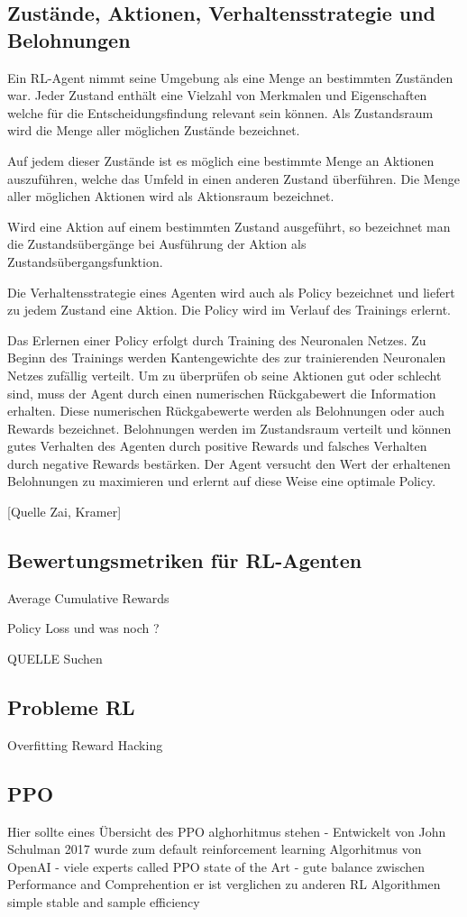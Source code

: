 \subsection{Zustände, Aktionen, Verhaltensstrategie und Belohnungen}
Ein RL-Agent nimmt seine Umgebung als eine Menge an bestimmten Zuständen war.
Jeder Zustand enthält eine Vielzahl von Merkmalen und Eigenschaften welche für die Entscheidungsfindung relevant sein können.
Als Zustandsraum wird die Menge aller möglichen Zustände bezeichnet.

Auf jedem dieser Zustände ist es möglich eine bestimmte Menge an Aktionen auszuführen, welche das Umfeld in einen anderen Zustand überführen.
Die Menge aller möglichen Aktionen wird als Aktionsraum bezeichnet.

Wird eine Aktion auf einem bestimmten Zustand ausgeführt, so bezeichnet man die Zustandsübergänge bei Ausführung der Aktion als Zustandsübergangsfunktion.


Die Verhaltensstrategie \pi eines Agenten wird auch als Policy bezeichnet und liefert zu jedem Zustand eine Aktion. Die Policy wird im Verlauf des Trainings erlernt.

Das Erlernen einer Policy erfolgt durch Training des Neuronalen Netzes.
Zu Beginn des Trainings werden Kantengewichte des zur trainierenden Neuronalen Netzes zufällig verteilt. Um zu überprüfen ob seine Aktionen gut oder schlecht sind, muss der Agent durch einen numerischen Rückgabewert die Information erhalten. Diese numerischen Rückgabewerte werden als Belohnungen oder auch Rewards bezeichnet. Belohnungen werden im Zustandsraum verteilt und können gutes Verhalten des Agenten durch positive Rewards und falsches Verhalten durch negative Rewards bestärken.
Der Agent versucht den Wert der erhaltenen Belohnungen zu maximieren und erlernt auf diese Weise eine optimale Policy.


[Quelle Zai, Kramer]

\subsection{Bewertungsmetriken für RL-Agenten}
Average Cumulative  Rewards

Policy Loss
und was noch ?

QUELLE Suchen

\subsection{Probleme RL}
Overfitting
Reward Hacking



\subsection{PPO}
Hier sollte eines Übersicht des PPO alghorhitmus stehen
- Entwickelt von John Schulman 2017 wurde zum default reinforcement learning Algorhitmus von OpenAI
- viele experts called PPO state of the Art
- gute balance zwischen Performance and Comprehention
er ist verglichen zu anderen RL Algorithmen simple stable and sample efficiency






